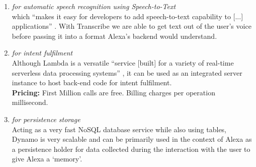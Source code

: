 \begin{enumerate}
%	
	
	
	\item[\href{https://aws.amazon.com/transcribe/}{\textbf{Transcribe}} \footnote{\url{https://aws.amazon.com/transcribe}}] \textit{for automatic speech recognition using Speech-to-Text}\\
	which ``makes it easy for developers to add speech-to-text capability to [...] applications'' \cite{aws_website}. With Transcribe we are able to get text out of the user's voice before passing it into a format Alexa's backend would understand.
	
%	
	

	\item[\href{https://aws.amazon.com/lambda/}{\textbf{Lambda}} \footnote{\url{https://aws.amazon.com/lambda}}] \textit{for intent fulfilment}\\
	Although Lambda is a versatile ``service [built] for a variety of real-time serverless data processing systems'' \cite{aws_website}, it can be used as an integrated server instance to host back-end code for intent fulfilment.\\	 %
	\textbf{Pricing:} First Million calls are free. Billing charges per operation millisecond.

	
%	
%



\item[\href{https://aws.amazon.com/dynamodb/}{\textbf{DynamoDB}} \footnote{\url{https://aws.amazon.com/dynamodb}}] \textit{for persistence storage}\\
Acting as a very fast NoSQL database service while also using tables,
Dynamo is very scalable and can be primarily used in the context of Alexa as a persistence holder for data collected during the interaction with the user to give Alexa a `memory'.




\end{enumerate}
